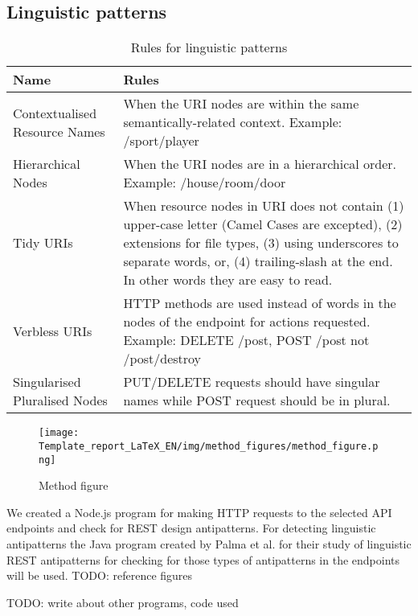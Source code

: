 \documentclass[a4paper,12pt]{article}
\begin{document}
\subsection{Linguistic patterns}


\begin{center}
\begin{table}[!ht]
\begin{tabular}{|p{30mm}|p{105mm}|}
\hline \textbf{Name} & \textbf{Rules} \\
\hline 
Contextualised Resource Names &
When the URI nodes are within the same semantically-related context. Example: /sport/player
\\ \hline
Hierarchical Nodes &
When the URI nodes are in a hierarchical order. Example: /house/room/door
\\ \hline
Tidy URIs &
When resource nodes in URI does not contain (1) upper-case letter (Camel Cases are excepted), (2)  extensions for file types, (3) using underscores to separate words, or, (4) trailing-slash at the end. In other words they are easy to read.
\\ \hline
Verbless URIs &
HTTP methods are used instead of words in the nodes of the endpoint for actions requested. Example: DELETE /post, POST /post not /post/destroy
\\ \hline
Singularised Pluralised Nodes &
PUT/DELETE requests should have singular names while POST request should be in plural.
\\ \hline
\end{tabular}
    \caption{Rules for linguistic patterns}
    \label{tab:Rules for linguistic patterns}
\end{table}
\end{center}

\begin{figure}
    \centering
    \texttt{[image: Template\_report\_LaTeX\_EN/img/method\_figures/method\_figure.png]}
    \caption{Method figure}
    \label{fig:Method figure}
\end{figure}

We created a Node.js program for making HTTP requests to the selected API endpoints and check for REST design antipatterns. For detecting linguistic antipatterns the Java program created by Palma et al. for their study of linguistic REST antipatterns \cite{linguistic} for checking for those types of antipatterns in the endpoints will be used. TODO: reference figures

TODO: write about other programs, code used
\end{document}
